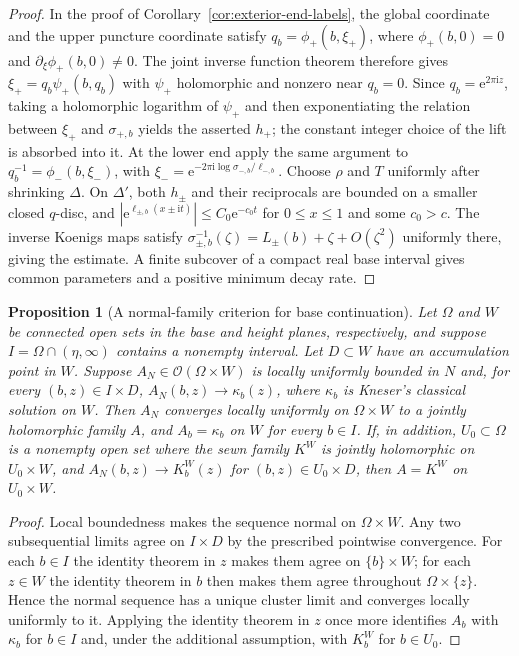 \documentclass[11pt,a4paper]{article}
\newtheorem{proposition}[theorem]{Proposition}
\theoremstyle{definition}
\newcommand{\Kk}{K}
\newcommand{\eee}{\mathrm{e}}
\newcommand{\ii}{\mathrm{i}}
\begin{document}
\begin{proof}
In the proof of Corollary~\ref{cor:exterior-end-labels}, the global
coordinate and the upper puncture coordinate satisfy
$q_b=\phi_+(b,\xi_+)$, where $\phi_+(b,0)=0$ and
$\partial_{\xi}\phi_+(b,0)\ne0$.  The joint inverse function theorem
therefore gives $\xi_+=q_b\psi_+(b,q_b)$ with $\psi_+$ holomorphic and
nonzero near $q_b=0$.  Since $q_b=\eee^{2\pi\ii z}$, taking a
holomorphic logarithm of $\psi_+$ and then exponentiating the relation
between $\xi_+$ and $\sigma_{+,b}$ yields the asserted $h_+$; the
constant integer choice of the lift is absorbed into it.  At the
lower end apply the same argument to
$q_b^{-1}=\phi_-(b,\xi_-)$, with
$\xi_-=\eee^{-2\pi\ii\log\sigma_{-,b}/\ell_{-,b}}$.
Choose $\rho$ and $T$ uniformly after shrinking $\Delta$.  On
$\Delta'$, both $h_\pm$ and their reciprocals are bounded on a
smaller closed $q$-disc, and
$|\eee^{\ell_{\pm,b}(x\pm\ii t)}|\le C_0\eee^{-c_0t}$
for $0\le x\le1$ and some $c_0>c$.  The inverse Koenigs maps satisfy
$\sigma_{\pm,b}^{-1}(\zeta)=L_\pm(b)+\zeta+O(\zeta^2)$ uniformly
there, giving the estimate.  A finite subcover of a compact real base
interval gives common parameters and a positive minimum decay rate.
\end{proof}

\begin{proposition}[A normal-family criterion for base continuation]
\label{prop:approx-continuation}
Let $\Omega$ and $W$ be connected open sets in the base and height planes,
respectively, and suppose $I=\Omega\cap(\eta,\infty)$ contains a nonempty
interval.  Let $D\subset W$ have an accumulation point in $W$.
Suppose $A_N\in\mathcal O(\Omega\times W)$ is locally uniformly bounded
in $N$ and, for every $(b,z)\in I\times D$,
$A_N(b,z)\to\kappa_b(z)$, where $\kappa_b$ is Kneser's classical solution
on $W$.  Then $A_N$ converges locally uniformly on $\Omega\times W$
to a jointly holomorphic family $A$, and $A_b=\kappa_b$ on $W$ for every
$b\in I$.  If, in addition, $U_0\subset\Omega$ is a nonempty open set
where the sewn family $\Kk^W$ is jointly holomorphic on $U_0\times W$,
and $A_N(b,z)\to\Kk_b^W(z)$ for $(b,z)\in U_0\times D$, then
$A=\Kk^W$ on $U_0\times W$.
\end{proposition}

\begin{proof}
Local boundedness makes the sequence normal on $\Omega\times W$.
Any two subsequential limits agree on $I\times D$ by the prescribed
pointwise convergence.  For each $b\in I$ the identity theorem in $z$
makes them agree on $\{b\}\times W$; for each $z\in W$ the identity
theorem in $b$ then makes them agree throughout $\Omega\times\{z\}$.
Hence the normal sequence has a unique cluster limit and converges
locally uniformly to it.  Applying the identity theorem in $z$ once
more identifies $A_b$ with $\kappa_b$ for $b\in I$ and, under the
additional assumption, with $\Kk_b^W$ for $b\in U_0$.
\end{proof}
\end{document}
